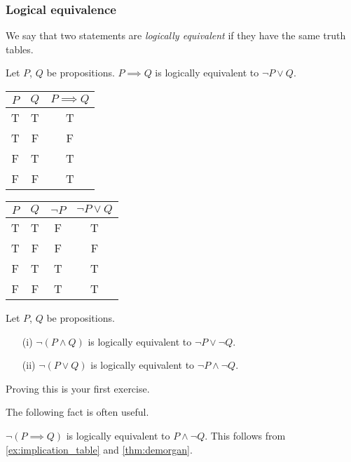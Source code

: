 \documentclass{article}
\begin{document}
\subsubsection{Logical equivalence}
We say that two statements are \emph{logically equivalent} if they have the same truth tables.

\begin{example}
\label{ex:implication_table}
Let $P$, $Q$ be propositions. $P \implies Q$ is logically equivalent to $\neg P \vee Q$.
 
 
\begin{tabular}{|c|c| c|}
\hline
     $P$& $Q$ &  $P \implies Q$ \\ \hline
     T& T & T \\ \hline
     T & F & F \\ \hline
     F & T & T \\ \hline
     F & F & T \\ \hline
\end{tabular} \hspace{2cm} \begin{tabular}{|c | c | c | c|}
\hline
     $P$& $Q$ & $\neg P$ & $\neg P \vee Q$  \\ \hline
     T& T & F & T \\ \hline
     T & F & F & F \\ \hline
     F & T &  T &T \\ \hline
     F & F & T & T \\ \hline
\end{tabular}
\end{example}

\vspace{1em}

\begin{theorem}
\label{thm:demorgan}
Let $P$, $Q$ be propositions.
\begin{enumerate}
    \item[(i)] $\neg (P \wedge Q)$ is logically equivalent to $\neg P \vee \neg Q$.
    \item[(ii)] $\neg (P \vee Q)$ is logically equivalent to $\neg P \wedge \neg Q$.
\end{enumerate}
\end{theorem}

Proving this is your first exercise.

The following fact is often useful.
\begin{example}
\label{ex:ifthen}
$\neg (P \implies Q)$ is logically equivalent to $P \wedge \neg Q$. This follows from \cref{ex:implication_table} and \cref{thm:demorgan}.
\end{example}
\end{document}
